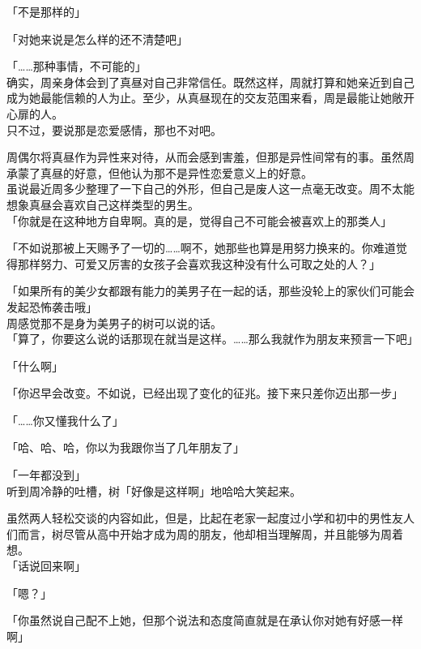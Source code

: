 「不是那样的」

「对她来说是怎么样的还不清楚吧」

「……那种事情，不可能的」\\

确实，周亲身体会到了真昼对自己非常信任。既然这样，周就打算和她亲近到自己成为她最能信赖的人为止。至少，从真昼现在的交友范围来看，周是最能让她敞开心扉的人。\\

只不过，要说那是恋爱感情，那也不对吧。

周偶尔将真昼作为异性来对待，从而会感到害羞，但那是异性间常有的事。虽然周承蒙了真昼的好意，但他认为那不是异性恋爱意义上的好意。\\

虽说最近周多少整理了一下自己的外形，但自己是废人这一点毫无改变。周不太能想象真昼会喜欢自己这样类型的男生。\\

「你就是在这种地方自卑啊。真的是，觉得自己不可能会被喜欢上的那类人」

「不如说那被上天赐予了一切的……啊不，她那些也算是用努力换来的。你难道觉得那样努力、可爱又厉害的女孩子会喜欢我这种没有什么可取之处的人？」

「如果所有的美少女都跟有能力的美男子在一起的话，那些没轮上的家伙们可能会发起恐怖袭击哦」\\

周感觉那不是身为美男子的树可以说的话。\\

「算了，你要这么说的话那现在就当是这样。……那么我就作为朋友来预言一下吧」

「什么啊」

「你迟早会改变。不如说，已经出现了变化的征兆。接下来只差你迈出那一步」

「……你又懂我什么了」

「哈、哈、哈，你以为我跟你当了几年朋友了」

「一年都没到」\\

听到周冷静的吐槽，树「好像是这样啊」地哈哈大笑起来。

虽然两人轻松交谈的内容如此，但是，比起在老家一起度过小学和初中的男性友人们而言，树尽管从高中开始才成为周的朋友，他却相当理解周，并且能够为周着想。\\

「话说回来啊」

「嗯？」

「你虽然说自己配不上她，但那个说法和态度简直就是在承认你对她有好感一样啊」

